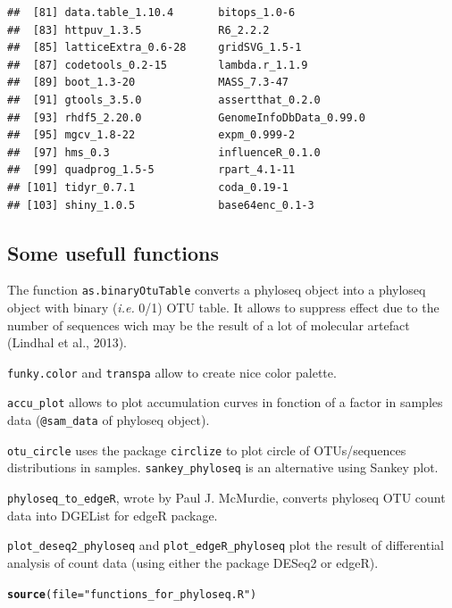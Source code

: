 \documentclass[12pt]{article}\usepackage[]{graphicx}\usepackage[]{color}
\makeatletter
\newcommand{\hlstr}[1]{\textcolor[rgb]{0.192,0.494,0.8}{#1}}%
\newcommand{\hlstd}[1]{\textcolor[rgb]{0.345,0.345,0.345}{#1}}%
\newcommand{\hlkwc}[1]{\textcolor[rgb]{0.333,0.667,0.333}{#1}}%
\newcommand{\hlkwd}[1]{\textcolor[rgb]{0.737,0.353,0.396}{\textbf{#1}}}%
\newenvironment{kframe}{%
 \def\at@end@of@kframe{}%
 \ifinner\ifhmode%
  \def\at@end@of@kframe{\end{minipage}}%
  \begin{minipage}{\columnwidth}%
 \fi\fi%
 \def\FrameCommand##1{\hskip\@totalleftmargin \hskip-\fboxsep
 \colorbox{shadecolor}{##1}\hskip-\fboxsep
     \hskip-\linewidth \hskip-\@totalleftmargin \hskip\columnwidth}%
 \MakeFramed {\advance\hsize-\width
   \@totalleftmargin\z@ \linewidth\hsize
   \@setminipage}}%
 {\par\unskip\endMakeFramed%
 \at@end@of@kframe}
\newenvironment{knitrout}{}{} %
\numberwithin{figure}{section}
\makeatother
\begin{document}
\begin{knitrout}
\begin{kframe}
\begin{verbatim}
##  [81] data.table_1.10.4       bitops_1.0-6           
##  [83] httpuv_1.3.5            R6_2.2.2               
##  [85] latticeExtra_0.6-28     gridSVG_1.5-1          
##  [87] codetools_0.2-15        lambda.r_1.1.9         
##  [89] boot_1.3-20             MASS_7.3-47            
##  [91] gtools_3.5.0            assertthat_0.2.0       
##  [93] rhdf5_2.20.0            GenomeInfoDbData_0.99.0
##  [95] mgcv_1.8-22             expm_0.999-2           
##  [97] hms_0.3                 influenceR_0.1.0       
##  [99] quadprog_1.5-5          rpart_4.1-11           
## [101] tidyr_0.7.1             coda_0.19-1            
## [103] shiny_1.0.5             base64enc_0.1-3
\end{verbatim}
\end{kframe}
\end{knitrout}

  \subsection{Some usefull functions}

The function \texttt{as.binaryOtuTable} converts a phyloseq object into a phyloseq object with binary (\textit{i.e.} 0/1) OTU table. It allows to suppress effect due to the number of sequences wich may be the result of a lot of molecular artefact (Lindhal et al., 2013).

\texttt{funky.color} and \texttt{transpa} allow to create nice color palette.

\texttt{accu\_plot} allows to plot accumulation curves in fonction of a factor in samples data (\texttt{@sam\_data} of phyloseq object).

\texttt{otu\_circle} uses the package \texttt{circlize} to plot circle of OTUs/sequences distributions in samples. \texttt{sankey\_phyloseq} is an alternative using Sankey plot.

\texttt{phyloseq\_to\_edgeR}, wrote by Paul J. McMurdie, converts phyloseq OTU count data into DGEList for edgeR package.

\texttt{plot\_deseq2\_phyloseq} and \texttt{plot\_edgeR\_phyloseq} plot the result of differential analysis of count data (using either the package DESeq2 or edgeR).

\begin{knitrout}\small
{}\color{fgcolor}\begin{kframe}
\begin{alltt}
\hlkwd{source}\hlstd{(}\hlkwc{file} \hlstd{=} \hlstr{"functions_for_phyloseq.R"}\hlstd{)}
\end{alltt}
\end{kframe}
\end{knitrout}
\end{document}

